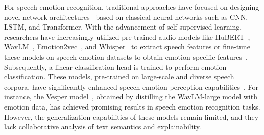 \documentclass[11pt]{article}
\begin{document}
For speech emotion recognition, traditional approaches have focused on designing novel network architectures~\citep{zou2022speech, chen2023dst, li2024multiscaletemporaltransformerspeech} based on classical neural networks such as CNN, LSTM, and Transformer.
With the advancement of self-supervised learning, researchers have increasingly utilized pre-trained audio models like HuBERT~\citep{hsu2021hubert}, WavLM~\citep{chen2022wavlm}, Emotion2vec~\citep{ma2023emotion2vec}, and Whisper~\citep{radford2023robust} to extract speech features or fine-tune these models on speech emotion datasets to obtain emotion-specific features~\citep{morais2022speech, chen2023exploring}.
Subsequently, a linear classification head is trained to perform emotion classification.
These models, pre-trained on large-scale and diverse speech corpora, have significantly enhanced speech emotion perception capabilities~\citep{li2023exploration}.
For instance, the Vesper model~\citep{chen2024vesper}, obtained by distilling the WavLM-large model with emotion data, has achieved promising results in speech emotion recognition tasks.
However, the generalization capabilities of these models remain limited, and they lack collaborative analysis of text semantics and explainability.
\end{document}
